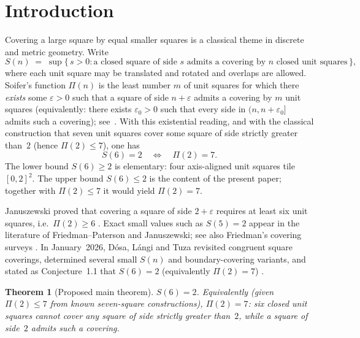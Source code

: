 \documentclass[11pt,reqno]{amsart}
\newtheorem{theorem}{Theorem}[section]
\theoremstyle{definition}
\begin{document}


\section{Introduction}\label{sec:intro}

Covering a large square by equal smaller squares is a classical theme in
discrete and metric geometry.  Write
\begin{equation}\label{eq:Sn}
S(n)
\;=\;
\sup\bigl\{\,s>0 :
\text{a closed square of side~$s$ admits a covering by~$n$ closed unit squares}
\,\bigr\},
\end{equation}
where each unit square may be translated and rotated and overlaps are allowed.
Soifer's function $\Pi(n)$ is the least number $m$ of unit squares for which
there \emph{exists} some $\varepsilon>0$ such that a square of side
$n+\varepsilon$ admits a covering by $m$ unit squares
(equivalently: there exists $\varepsilon_0>0$ such that every side in
$(n,n+\varepsilon_0]$ admits such a covering);
see~\cite{Soifer2006,SoiferCoverUp}.  With this existential reading, and with
the classical construction that seven unit squares cover some square of side
strictly greater than~$2$ (hence $\Pi(2)\le 7$), one has
\begin{equation}\label{eq:equiv}
S(6)=2
\quad\Longleftrightarrow\quad
\Pi(2)=7.
\end{equation}
The lower bound $S(6)\ge 2$ is elementary: four axis-aligned unit squares tile
$[0,2]^2$.  The upper bound $S(6)\le 2$ is the content of the present
paper; together with $\Pi(2)\le 7$ it would yield $\Pi(2)=7$.

Januszewski proved that covering a square of side $2+\varepsilon$ requires at
least six unit squares, i.e.\ $\Pi(2)\ge 6$ \cite{Januszewski2009}.
Exact small values such as $S(5)=2$ appear in the literature of
Friedman--Paterson and Januszewski; see also Friedman's covering surveys
\cite{FriedmanPaterson2006,FriedmanCovering}.
In January~2026, D\'osa, L\'angi and Tuza revisited congruent square coverings,
determined several small $S(n)$ and boundary-covering variants, and stated as
Conjecture~1.1 that $S(6)=2$ (equivalently $\Pi(2)=7$) \cite{DLT2026}.

\begin{theorem}[Proposed main theorem]\label{thm:main}
$S(6)=2$.  Equivalently (given $\Pi(2)\le 7$ from known seven-square
constructions), $\Pi(2)=7$: six closed unit squares cannot cover any square of
side strictly greater than~$2$, while a square of side~$2$ admits such a
covering.
\end{theorem}
\end{document}
